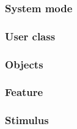 \documentclass{article}
\begin{document}
\subsubsection{System mode}

\subsubsection{User class}

\subsubsection{Objects}

\subsubsection{Feature}

\subsubsection{Stimulus}
\end{document}
